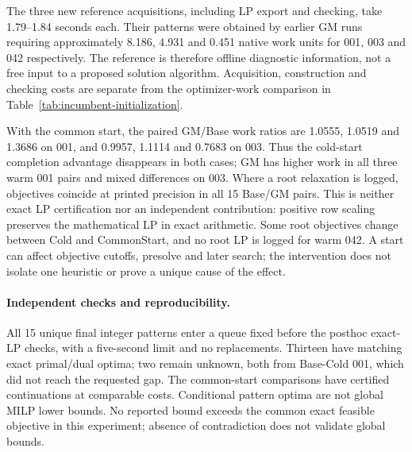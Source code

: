 \documentclass[11pt]{article}
\begin{document}
The three new reference acquisitions, including LP export and checking, take
1.79--1.84 seconds each. Their patterns were obtained by earlier GM runs requiring
approximately 8.186, 4.931 and 0.451 native work units for 001, 003 and 042 respectively.
The reference is therefore offline diagnostic information, not a free input to a
proposed solution algorithm. Acquisition, construction and checking costs are separate
from the optimizer-work comparison in Table~\ref{tab:incumbent-initialization}.

\begin{table}[tb]
\centering\small
\caption{Auxiliary common-incumbent diagnostic on three known cases and seeds 503,
509 and 521. Completion counts calls reaching the requested native gap, not certified
global optimality. Work is the median over all three assigned calls, including censored
ones; ratios involving those censored calls are not speedups. Both zero work values on
warm instance042 are native reports, not zero total cost, and are not divided into ratios.}
\label{tab:incumbent-initialization}

\end{table}

With the common start, the paired GM/Base work ratios are 1.0555, 1.0519 and 1.3686
on 001, and 0.9957, 1.1114 and 0.7683 on 003. Thus the cold-start completion advantage
disappears in both cases; GM has higher work in all three warm 001 pairs and mixed
differences on 003. Where a root relaxation is logged, objectives coincide at printed
precision in all 15 Base/GM pairs. This is neither exact LP certification nor an
independent contribution: positive row scaling preserves the mathematical LP in exact
arithmetic. Some root objectives change between Cold and CommonStart, and no root LP
is logged for warm 042. A start can affect objective cutoffs, presolve and later search;
the intervention does not isolate one heuristic or prove a unique cause of the effect.

\paragraph{Independent checks and reproducibility.}
All 15 unique final integer patterns enter a queue fixed before the posthoc exact-LP
checks, with a five-second limit and no replacements. Thirteen have matching exact
primal/dual optima; two remain unknown, both from Base-Cold 001, which did not reach
the requested gap. The common-start comparisons have certified continuations at
comparable costs. Conditional pattern optima are not global MILP lower bounds.
No reported bound exceeds the common exact feasible objective in this experiment;
absence of contradiction does not validate global bounds.
\end{document}
